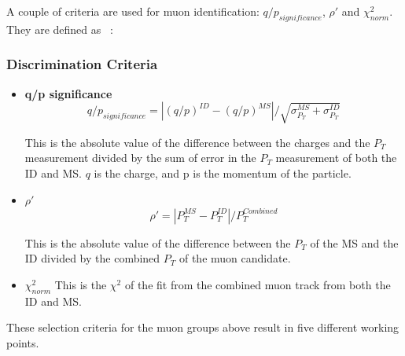 A couple of criteria are used for muon identification: $q/p_{significance}$, $\rho'$ and $\chi^{2}_{norm}$. They are defined as ~\cite{muonReco2016}:

\subsubsection*{Discrimination Criteria}
\begin{itemize}

\item \textbf{q/p significance}
    \begin{equation}
    q/p_{significance} = |(q/p)^{ID} - (q/p)^{MS}|/\sqrt{\sigma^{MS}_{P_{T}} + \sigma^{ID}_{P_{T}}}
    \end{equation}

    This is the absolute value of the difference between the charges and the $P_{T}$ measurement divided by the sum of error in the $P_{T}$ measurement of both the ID and MS. $q$ is the charge, and p is the momentum of the particle.

\item \textbf{$\rho'$}
    \begin{equation}
    \rho' = |P_{T}^{MS} - P_{T}^{ID}| / P_{T}^{Combined}
    \end{equation}

This is the absolute value of the difference between the $P_{T}$ of the MS and the ID divided by the combined $P_{T}$ of the muon candidate.

\item \textbf{$\chi_{norm}^{2}$}
    This is the $\chi^{2}$ of the fit from the combined muon track from both the ID and MS.

\end{itemize}

These selection criteria for the muon groups above result in five different working points.

